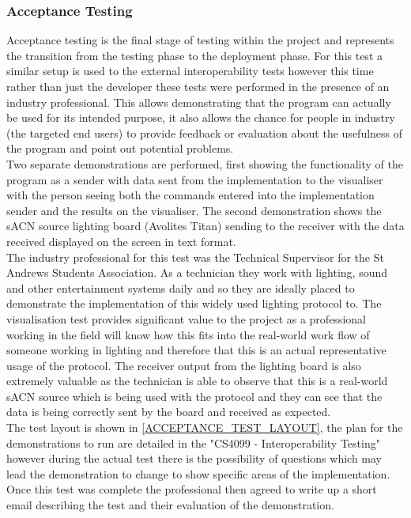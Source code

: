 \documentclass[11pt,a4paper]{article}
\begin{document}
\subsubsection{Acceptance Testing}
Acceptance testing is the final stage of testing within the project and represents the transition from the testing phase to the deployment phase. For this test a similar setup is used to the external interoperability tests however this time rather than just the developer these tests were performed in the presence of an industry professional. This allows demonstrating that the program can actually be used for its intended purpose, it also allows the chance for people in industry (the targeted end users) to provide feedback or evaluation about the usefulness of the program and point out potential problems. \\

Two separate demonstrations are performed, first showing the functionality of the program as a sender with data sent from the implementation to the visualiser with the person seeing both the commands entered into the implementation sender and the results on the visualiser. The second demonstration shows the sACN source lighting board (Avolites Titan) sending to the receiver with the data received displayed on the screen in text format. \\

The industry professional for this test was the Technical Supervisor for the St Andrews Students Association. As a technician they work with lighting, sound and other entertainment systems daily and so they are ideally placed to demonstrate the implementation of this widely used lighting protocol to. The visualisation test provides significant value to the project as a professional working in the field will know how this fits into the real-world work flow of someone working in lighting and therefore that this is an actual representative usage of the protocol. The receiver output from the lighting board is also extremely valuable as the technician is able to observe that this is a real-world sACN source which is being used with the protocol and they can see that the data is being correctly sent by the board and received as expected.  \\

The test layout is shown in \ref{ACCEPTANCE_TEST_LAYOUT}, the plan for the demonstrations to run are detailed in the "CS4099 - Interoperability Testing" however during the actual test there is the possibility of questions which may lead the demonstration to change to show specific areas of the implementation. Once this test was complete the professional then agreed to write up a short email describing the test and their evaluation of the demonstration.\\ 
\end{document}
